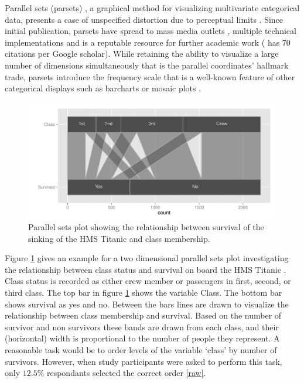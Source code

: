 Parallel sets (parsets)  \cite{kosara:2006}, a graphical method  for visualizing multivariate categorical data, presents a case of unspecified distortion due to perceptual limits . Since initial publication, parsets have spread to mass media outlets  \cite{eagereyes, bostock:2012, bbc:2009}, multiple technical implementations \cite{eagereyes, d3, davies} and is a reputable resource for further academic work (\cite{kosara:2006} has 70 citations per Google scholar). While retaining the %
ability to visualize a large number of dimensions simultaneously that is the parallel coordinates' hallmark trade, parsets introduce the frequency scale that is a well-known feature of other categorical displays such as barcharts or mosaic plots \cite{hartigan:1981, friendly:1992, hofmann:2000, theus:1997}.


\begin{figure}[hbtp]
\centering
\includegraphics[width=.9\linewidth]{images/parset-titanic}
\caption{\label{question1a} Parallel sets plot showing the relationship between survival of the sinking of the HMS Titanic and class membership. }
\end{figure}


Figure \ref{question1a} gives an example for a two dimensional parallel sets plot investigating the relationship between class status and survival on board the HMS Titanic  \cite{dawson:1995}. Class status is recorded as either crew member or passengers in  first, second, or third class.  The top bar in figure \ref{question1a} shows the  variable Class. The bottom bar shows survival  as yes and no. Between the bars lines are drawn to visualize the relationship between class membership and  survival. 
  Based on the number of survivor and non survivors
  these bands are drawn from each class, and their (horizontal) width is proportional to the number of people they represent. A reasonable task would be to order levels of the variable `class' by number of survivors. However, when study participants were asked to perform this task, only $12.5\%$ respondants 
selected the correct order \ref{raw}.

